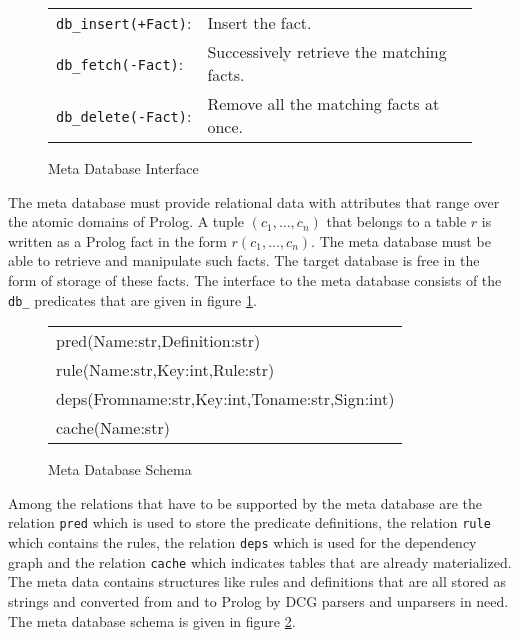 \begin{figure}
\begin{center}
\begin{tabular}{ll}
\verb.db_insert(+Fact).: & Insert the fact. \\
\verb.db_fetch(-Fact).: & Successively retrieve the matching facts. \\
\verb.db_delete(-Fact).: & Remove all the matching facts at once.
\end{tabular}
\end{center}
\caption{Meta Database Interface}
\label{figmeta}
\end{figure}

The meta database must provide relational data with attributes that range over the atomic
domains of Prolog. A tuple $(c_1,\ldots,c_n)$ that belongs to a table $r$ is written as
a Prolog fact in the form $r(c_1,\ldots,c_n)$. The meta database must be able to retrieve
and manipulate such facts. The target database is free in the form of storage of these 
facts. The interface to the meta database consists of the \verb.db_. predicates that are
given in figure \ref{figmeta}.

\begin{figure}
\begin{center}
\begin{tabular}{l}
pred(Name:str,Definition:str) \\
rule(Name:str,Key:int,Rule:str) \\
deps(Fromname:str,Key:int,Toname:str,Sign:int) \\
cache(Name:str)
\end{tabular}
\end{center}
\caption{Meta Database Schema}
\label{figmsch}
\end{figure}

Among the relations that have to be supported by the meta database are the relation
\verb.pred. which is used to store the predicate definitions, the relation \verb.rule.
which contains the rules, the relation \verb.deps. which is used for the dependency graph and 
the relation \verb.cache. which indicates tables that are already materialized. The meta data 
contains structures like rules and definitions that are all stored as strings and converted 
from and to Prolog by DCG parsers and unparsers in need. The meta database schema is given
in figure \ref{figmsch}.

